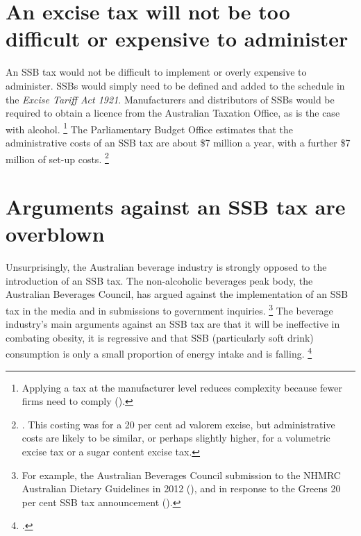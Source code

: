 \documentclass[embargoed]{grattan}
\begin{document}
\section{An excise tax will not be too difficult or expensive to administer}\label{an-excise-tax-will-not-be-too-difficult-or-expensive-to-administer}

An SSB tax would not be difficult to implement or overly expensive to administer.
SSBs would simply need to be defined and added to the schedule in the \emph{Excise Tariff Act 1921}.
Manufacturers and distributors of SSBs would be required to obtain a licence from the Australian Taxation Office, as is the case with alcohol.%
\footnote{Applying a tax at the manufacturer level reduces complexity because fewer firms need to comply (\textcites{CnossenExcisetaxationAustralia}{Freebairn2010Taxationobesity}).} The Parliamentary Budget Office estimates that the administrative costs of an SSB tax are about \$7 million a year, with a further \$7 million of set-up costs.%
\footnote{\textcite{Office2016PolicycostingAustralian}.
This costing was for a 20 per cent ad valorem excise, but administrative costs are likely to be similar, or perhaps slightly higher, for a volumetric excise tax or a sugar content excise tax.}


\section{Arguments against an SSB tax are overblown}\label{arguments-against-an-ssb-tax-are-overblown}

Unsurprisingly, the Australian beverage industry is strongly opposed to the introduction of an SSB tax.
The non-alcoholic beverages peak body, the Australian Beverages Council, has argued against the implementation of an SSB tax in the media and in submissions to government inquiries.%
\footnote{For example, the Australian Beverages Council submission to the NHMRC Australian Dietary Guidelines in 2012 (\textcite{Council2012AustralianBeveragesCouncil}), and in response to the Greens 20 per cent SSB tax announcement (\textcite{Council2016Softdrinktax}).} The beverage industry's main arguments against an SSB tax are that it will be ineffective in combating obesity, it is regressive and that SSB (particularly soft drink) consumption is only a small proportion of energy intake and is falling.%
\footcite{Sharma2014effectstaxingsugarsweetened}  
\end{document}
